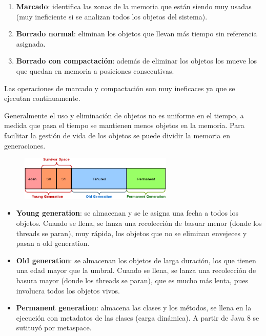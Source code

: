 \documentclass{article}
\begin{document}
\begin{enumerate}
    \item \textbf{Marcado}: identifica las zonas de la memoria que están siendo muy usadas (muy ineficiente si se analizan todos los objetos del sistema).

    \item \textbf{Borrado normal}: eliminan los objetos que llevan más tiempo sin referencia asignada.

    \item \textbf{Borrado con compactación}: además de eliminar los objetos los mueve los que quedan en memoria a posiciones consecutivas. 
\end{enumerate}
Las operaciones de marcado y compactación son muy ineficaces ya que se ejecutan continuamente.

\newpage

Generalmente el uso y eliminación de objetos no es uniforme en el tiempo, a medida que pasa el tiempo se mantienen menos objetos en la memoria. Para facilitar la gestión de vida de los objetos se puede dividir la memoria en generaciones. 

\begin{figure}[h]
    \centering
    \includegraphics[width=0.65\textwidth]{img-t2/img_314_39.png}
\end{figure}

\begin{itemize}
    \item \textbf{Young generation}: se almacenan y se le asigna una fecha a todos los objetos. Cuando se llena, se lanza una recolección de basuar menor (donde los threads se paran), muy rápida, los objetos que no se eliminan envejeces y pasan a old generation.

    \item \textbf{Old generation}: se almacenan los objetos de larga duración, los que tienen una edad mayor que la umbral. Cuando se llena, se lanza una recolección de basura mayor (donde los threads se paran), que es mucho más lenta, pues involucra todos los objetos vivos.

    \item \textbf{Permanent generation}: almacena las clases y los métodos, se llena en la ejecución con metadatos de las clases (carga dinámica). A partir de Java 8 se sutituyó por metaspace.
\end{itemize}
\end{document}
